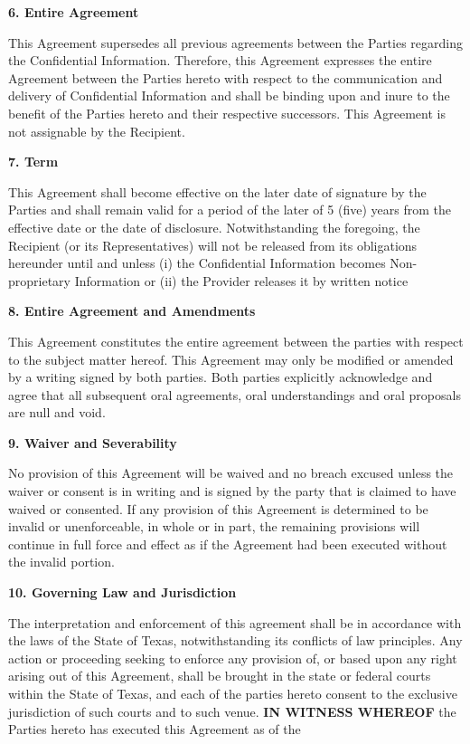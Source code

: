 \documentclass[11pt,a4paper]{article} %
\begin{document}
\textbf{6. Entire Agreement}

This Agreement supersedes all previous agreements between the Parties
regarding the Confidential Information. Therefore, this Agreement
expresses the entire Agreement between the Parties hereto with respect
to the communication and delivery of Confidential Information and shall
be binding upon and inure to the benefit of the Parties hereto and their
respective successors. This Agreement is not assignable by the
Recipient.

\textbf{7. Term}

This Agreement shall become effective on the later date of signature by
the Parties and shall remain valid for a period of the later of 5 (five)
years from the effective date or the date of disclosure. Notwithstanding
the foregoing, the Recipient (or its Representatives) will not be
released from its obligations hereunder until and unless (i) the
Confidential Information becomes Non-proprietary Information or (ii) the
Provider releases it by written notice

\textbf{8. Entire Agreement and Amendments}

This Agreement constitutes the entire agreement between the parties with
respect to the subject matter hereof. This Agreement may only be
modified or amended by a writing signed by both parties. Both parties
explicitly acknowledge and agree that all subsequent oral agreements,
oral understandings and oral proposals are null and void.

\textbf{9. Waiver and Severability}

No provision of this Agreement will be waived and no breach excused
unless the waiver or consent is in writing and is signed by the party
that is claimed to have waived or consented. If any provision of this
Agreement is determined to be invalid or unenforceable, in whole or in
part, the remaining provisions will continue in full force and effect as
if the Agreement had been executed without the invalid portion.

\textbf{10. Governing Law and Jurisdiction}

The interpretation and enforcement of this agreement shall be in
accordance with the laws of the State of Texas, notwithstanding its
conflicts of law principles. Any action or proceeding seeking to enforce
any provision of, or based upon any right arising out of this Agreement,
shall be brought in the state or federal courts within the State of
Texas, and each of the parties hereto consent to the exclusive
jurisdiction of such courts and to such venue.
\newpage
\textbf{IN WITNESS WHEREOF} the Parties hereto has executed this
Agreement as of the 
\end{document}
